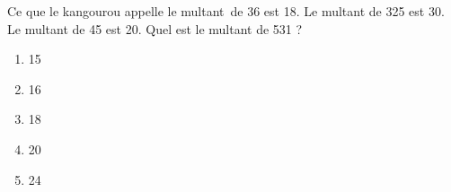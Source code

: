 Ce que le kangourou appelle le \og multant\fg\ de 36 est 18. Le multant de 325 est 30. Le multant de 45 est 20. Quel est le multant de 531 ?
\begin{multicols}{5}
  \begin{enumerate}[A/]
  \item 15
  \item 16
  \item 18
  \item 20
  \item 24
  \end{enumerate}
\end{multicols}